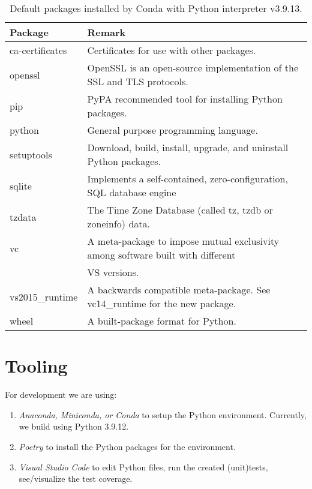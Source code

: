 \begin{table}[]
	\caption{Default packages installed by Conda with Python interpreter v3.9.13.}
	\begin{tabular}{|p{4cm}|p{10cm}|}
		\hline
		\textbf{Package}    & \textbf{Remark} \\ \hline
		ca-certificates     & Certificates for use with other packages.\\ \hline
		openssl             & OpenSSL is an open-source implementation of the SSL and TLS protocols. \\ \hline
		pip                 & PyPA recommended tool for installing Python packages. \\ \hline
		python              & General purpose programming language. \\ \hline
		setuptools          & Download, build, install, upgrade, and uninstall Python packages. \\ \hline
		sqlite              & Implements a self-contained, zero-configuration, SQL database engine \\ \hline
		tzdata              & The Time Zone Database (called tz, tzdb or zoneinfo) data. \\ \hline
		vc                  & A meta-package to impose mutual exclusivity among software built with different
		\\ & VS versions. \\ \hline
		vs2015\_runtime     & A backwards compatible meta-package. See vc14\_runtime for the new package. \\ \hline
		wheel               & A built-package format for Python. \\ \hline
	\end{tabular}
\end{table}

\section{Tooling}
For \dfastmi development we are using:

\begin{enumerate}
\item \emph{Anaconda, Miniconda, or Conda} to setup the Python environment.
Currently, we build using Python 3.9.12.
\item \emph{Poetry} to install the Python packages for the environment.
\item \emph{Visual Studio Code} to edit Python files, run the created (unit)tests, see/visualize the test coverage.
\end{enumerate}

